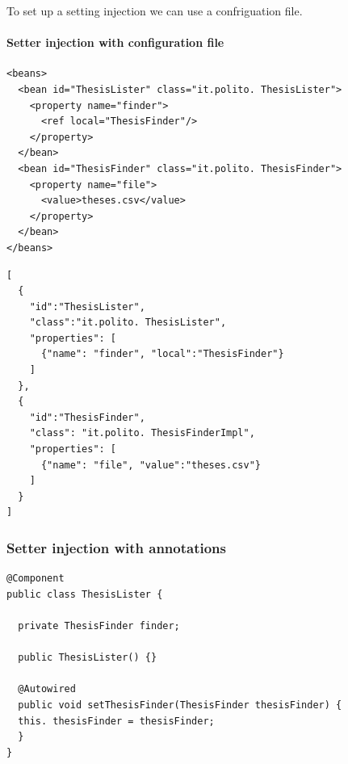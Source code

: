 To set up a setting injection we can use a confriguation file.


\paragraph{Setter injection with configuration file}

\begin{center}
  \begin{minipage}{0.45\linewidth}
    \begin{verbatim}
<beans>
  <bean id="ThesisLister" class="it.polito. ThesisLister">
    <property name="finder">
      <ref local="ThesisFinder"/>
    </property>
  </bean>
  <bean id="ThesisFinder" class="it.polito. ThesisFinder">
    <property name="file">
      <value>theses.csv</value>
    </property>
  </bean>
</beans>
\end{verbatim}
  \end{minipage}%
  \hfill
  \begin{minipage}{0.45\linewidth}
    \begin{verbatim}
[
  {
    "id":"ThesisLister",
    "class":"it.polito. ThesisLister",
    "properties": [
      {"name": "finder", "local":"ThesisFinder"}
    ]
  },
  {
    "id":"ThesisFinder",
    "class": "it.polito. ThesisFinderImpl",
    "properties": [
      {"name": "file", "value":"theses.csv"}
    ]
  }
]
\end{verbatim}
  \end{minipage}
\end{center}



\subsubsection{Setter injection with annotations}

\begin{verbatim}
@Component
public class ThesisLister {

  private ThesisFinder finder;

  public ThesisLister() {}

  @Autowired
  public void setThesisFinder(ThesisFinder thesisFinder) {
  this. thesisFinder = thesisFinder;
  }
}
\end{verbatim}



